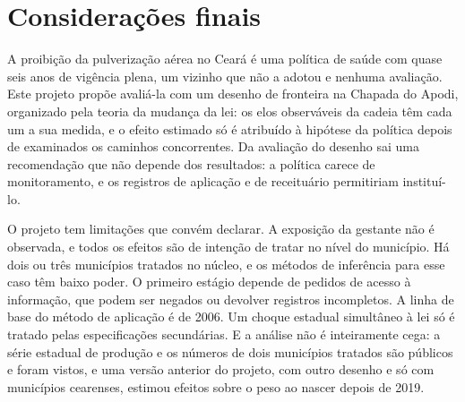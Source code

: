 \chapter{Considerações finais}
\label{sec:conclusao}

A proibição da pulverização aérea no Ceará é uma política de saúde com quase
seis anos de vigência plena, um vizinho que não a adotou e nenhuma avaliação.
Este projeto propõe avaliá-la com um desenho de fronteira na Chapada do Apodi,
organizado pela teoria da mudança da lei: os elos observáveis da cadeia têm cada
um a sua medida, e o efeito estimado só é atribuído à hipótese da política
depois de examinados os caminhos concorrentes. Da avaliação do desenho sai uma
recomendação que não depende dos resultados: a política carece de
monitoramento, e os registros de aplicação e de receituário permitiriam
instituí-lo.

O projeto tem limitações que convém declarar. A exposição da gestante não é
observada, e todos os efeitos são de intenção de tratar no nível do município.
Há dois ou três municípios tratados no núcleo, e os métodos de inferência para
esse caso têm baixo poder. O primeiro estágio depende de pedidos de acesso à
informação, que podem ser negados ou devolver registros incompletos. A linha de
base do método de aplicação é de 2006. Um choque estadual simultâneo à lei só é
tratado pelas especificações secundárias. E a análise não é inteiramente cega: a
série estadual de produção e os números de dois municípios tratados são
públicos e foram vistos, e uma versão anterior do projeto, com outro desenho e
só com municípios cearenses, estimou efeitos sobre o peso ao nascer depois de
2019.

